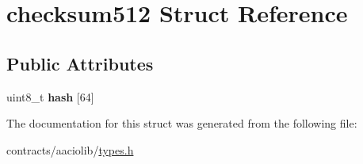 \hypertarget{structchecksum512}{}\section{checksum512 Struct Reference}
\label{structchecksum512}
\subsection*{Public Attributes}
\begin{DoxyCompactItemize}
\item 
\mbox{\label{structchecksum512_a33e7eb4ee16c0d2aec93c7755b552cdb}} 
uint8\+\_\+t {\bfseries hash} \mbox{[}64\mbox{]}
\end{DoxyCompactItemize}


The documentation for this struct was generated from the following file\+:\begin{DoxyCompactItemize}
\item 
contracts/aaciolib/\mbox{\hyperlink{contracts_2aaciolib_2types_8h}{types.\+h}}\end{DoxyCompactItemize}
